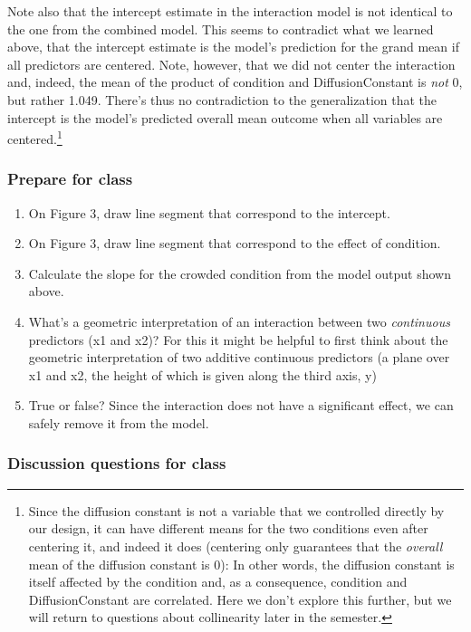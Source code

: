 \documentclass[
]{article}
\providecommand{\tightlist}{%
  \setlength{\itemsep}{0pt}\setlength{\parskip}{0pt}}
\begin{document}
Note also that the intercept estimate in the interaction model is not
identical to the one from the combined model. This seems to contradict
what we learned above, that the intercept estimate is the model's
prediction for the grand mean if all predictors are centered. Note,
however, that we did not center the interaction and, indeed, the mean of
the product of condition and DiffusionConstant is \emph{not} 0, but
rather 1.049. There's thus no contradiction to the generalization that
the intercept is the model's predicted overall mean outcome when all
variables are centered.\footnote{Since the diffusion constant is not a
  variable that we controlled directly by our design, it can have
  different means for the two conditions even after centering it, and
  indeed it does (centering only guarantees that the \emph{overall} mean
  of the diffusion constant is 0): In other words, the diffusion
  constant is itself affected by the condition and, as a consequence,
  condition and DiffusionConstant are correlated. Here we don't explore
  this further, but we will return to questions about collinearity later
  in the semester.}

\hypertarget{prepare-for-class-3}{%
\subsubsection{Prepare for class}\label{prepare-for-class-3}}

\begin{enumerate}
\def\labelenumi{\arabic{enumi}.}
\tightlist
\item
  On Figure 3, draw line segment that correspond to the intercept.
\item
  On Figure 3, draw line segment that correspond to the effect of
  condition.
\item
  Calculate the slope for the crowded condition from the model output
  shown above.
\item
  What's a geometric interpretation of an interaction between two
  \emph{continuous} predictors (x1 and x2)? For this it might be helpful
  to first think about the geometric interpretation of two additive
  continuous predictors (a plane over x1 and x2, the height of which is
  given along the third axis, y)
\item
  True or false? Since the interaction does not have a significant
  effect, we can safely remove it from the model.
\end{enumerate}

\hypertarget{discussion-questions-for-class-2}{%
\subsubsection{Discussion questions for
class}\label{discussion-questions-for-class-2}}
\end{document}
